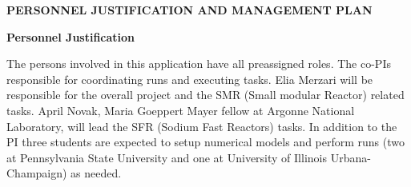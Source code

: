 \documentclass[11pt,letterpaper,english]{article}
\begin{document}
\setlength{\parindent}{0in} %

\pagestyle{fancy}   \renewcommand{%
\headrulewidth}{0.0pt}

\begin{center}
\bf {PERSONNEL JUSTIFICATION AND MANAGEMENT PLAN} \\
\end{center}

\vspace{-.25in}
\begin{flushleft}
{\noindent \bf  {Personnel Justification}}

The persons involved in this application have all preassigned roles. The co-PIs responsible for coordinating runs and executing tasks. Elia Merzari will be responsible for the overall  project and the SMR (Small modular Reactor) related tasks. April Novak, Maria Goeppert Mayer fellow at Argonne National Laboratory, will lead the SFR (Sodium Fast Reactors) tasks. In addition to the PI three students are expected to setup numerical models and perform runs (two at Pennsylvania State University and one at University of Illinois Urbana-Champaign) as needed.


\end{flushleft}
\end{document}
